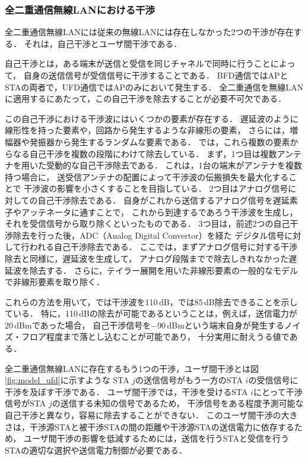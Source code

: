 \documentclass[master]{kuisthesis}		%
\begin{document}
		\subsubsection{全二重通信無線LANにおける干渉}\label{sec:interference}
			全二重通信無線LANには従来の無線LANには存在しなかった2つの干渉が存在する．
			それは，自己干渉とユーザ間干渉である．
			\par
			自己干渉とは，ある端末が送信と受信を同じチャネルで同時に行うことによって，
			自身の送信信号が受信信号に干渉することである．
			BFD通信ではAPとSTAの両者で，UFD通信ではAPのみにおいて発生する．
			全二重通信を無線LANに適用するにあたって，この自己干渉を除去することが必要不可欠である．

			\par
			この自己干渉における干渉波にはいくつかの要素が存在する．
			遅延波のように線形性を持った要素や，回路から発生するような非線形の要素，
			さらには，増幅器や発振器から発生するランダムな要素である．
			\cite{stanford1,fdmac}では，これら複数の要素からなる自己干渉を複数の段階にわけて除去している．
			まず，1つ目は複数アンテナを用いた受動的な自己干渉除去である．
			これは，1台の端末がアンテナを複数持つ場合に，
			送受信アンテナの配置によって干渉波の伝搬損失を最大化することで
			干渉波の影響を小さくすることを目指している．
			2つ目はアナログ信号に対しての自己干渉除去である．
			自身がこれから送信するアナログ信号を遅延素子やアッテネータに通すことで，
			これから到達するであろう干渉波を生成し，それを受信信号から取り除くといったものである．
			3つ目は，前述2つの自己干渉除去を行った後，ADC（Analog Digital Convertor）を経た
			デジタル信号に対して行われる自己干渉除去である．
			ここでは，まずアナログ信号に対する干渉除去と同様に，遅延波を生成して，
			アナログ段階までで除去しきれなかった遅延波を除去する．
			さらに，テイラー展開を用いた非線形要素の一般的なモデルで非線形要素を取り除く．

			\par
			これらの方法を用いて，\cite{stanford1}では干渉波を110\,dB，\cite{fdmac}では85\,dB除去できることを示している．
			特に，110\,dBの除去が可能であるということは，例えば，送信電力が20\,dBmであった場合，
			自己干渉信号を$-$90\,dBmという端末自身が発生するノイズ・フロア程度まで落とし込むことが可能であり，
			十分実用に耐えうる値である．
			\par
			全二重通信無線LANに存在するもう1つの干渉，ユーザ間干渉とは図\ref{fig:model_ufd}に示すような
			STA $j$の送信信号がもう一方のSTA $i$の受信信号に干渉を及ぼす干渉である．
			ユーザ間干渉では，干渉を受けるSTA $i$にとって干渉信号がSTA $j$の送信する未知の信号であるため，
			干渉信号をある程度予測可能な自己干渉と異なり，容易に除去することができない．
			このユーザ間干渉の大きさは，干渉源STAと被干渉STAの間の距離や干渉源STAの送信電力に依存するため，
			ユーザ間干渉の影響を低減するためには，送信を行うSTAと受信を行うSTAの適切な選択や送信電力制御が必要である．
\end{document}

